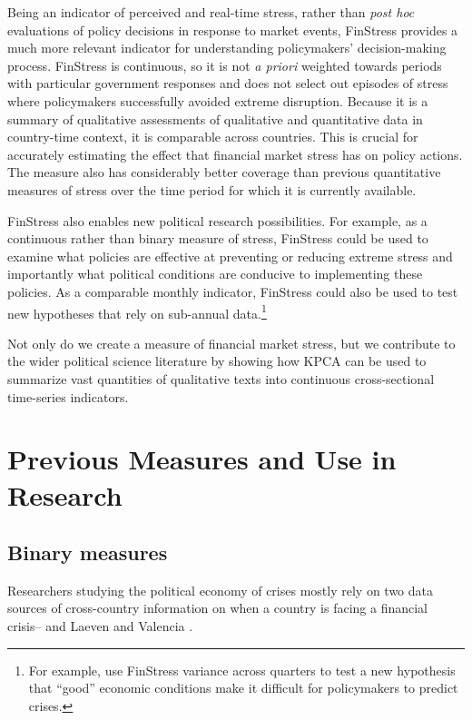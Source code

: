 \documentclass[]{article}
\begin{document}
Being an indicator of perceived and real-time stress, rather than \emph{post hoc} evaluations of policy decisions in response to market events, FinStress provides a much more relevant indicator for understanding policymakers' decision-making process. FinStress is continuous, so it is not \textit{a priori} weighted towards periods with particular government responses and does not select out episodes of stress where policymakers successfully avoided extreme disruption. Because it is a summary of qualitative assessments of qualitative and quantitative data in country-time context, it is comparable across countries. This is crucial for accurately estimating the effect that financial market stress has on policy actions. The measure also has considerably better coverage than previous quantitative measures of stress over the time period for which it is currently available.

FinStress also enables new political research possibilities. For example, as a continuous rather than binary measure of stress, FinStress could be used to examine what policies are effective at preventing or reducing extreme stress and importantly what political conditions are conducive to implementing these policies. As a comparable monthly indicator, FinStress could also be used to test new hypotheses that rely on sub-annual data.\footnote{For example, \cite{gandrud_pepinsky2015} use FinStress variance across quarters to test a new hypothesis that ``good'' economic conditions make it difficult for policymakers to predict crises.}

Not only do we create a measure of financial market stress, but we contribute to the wider political science literature by showing how KPCA can be used to summarize vast quantities of qualitative texts into continuous cross-sectional time-series indicators.

\section{Previous Measures and Use in Research}\label{motivation}

\subsection{Binary measures}

Researchers studying the political economy of crises mostly rely on two data sources of cross-country information on when a country is facing a financial crisis--\cite{Reinhart2009,ReinhartRog2010} and Laeven and Valencia \citeyearpar[and their predecessors]{laeven2013}.
\end{document}
